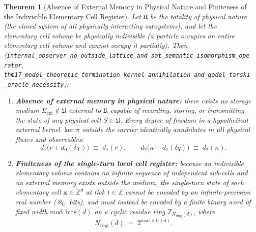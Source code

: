 \documentclass[11pt,a4paper]{article}
\theoremstyle{plain}
\newtheorem{theorem}{Theorem}[section]
\theoremstyle{definition}
\begin{document}
\begin{theorem}[Absence of External Memory in Physical Nature and Finiteness of the Indivisible Elementary Cell Register]
\label{thm:no-external-memory}
Let $\mathfrak{U}$ be the totality of physical nature (the closed system of all physically interacting subsystems), and let the elementary cell volume be physically indivisible (a particle occupies an entire elementary cell volume and cannot occupy it partially). Then (\texttt{internal\_\allowbreak observer\_\allowbreak no\_\allowbreak outside\_\allowbreak lattice\_\allowbreak and\_\allowbreak sat\_\allowbreak semantic\_\allowbreak isomorphism\_\allowbreak operator}, \texttt{thm17\_\allowbreak model\_\allowbreak theoretic\_\allowbreak termination\_\allowbreak kernel\_\allowbreak annihilation\_\allowbreak and\_\allowbreak godel\_\allowbreak tarski\_\allowbreak oracle\_\allowbreak necessity}):
\begin{enumerate}[label=\textbf{(\arabic*)},leftmargin=*]
\item \textbf{Absence of external memory in physical nature:}
  there exists no storage medium $E_{\mathrm{ext}} \notin \mathfrak{U}$ external to $\mathfrak{U}$ capable of recording, storing, or transmitting the state of any physical cell $S \in \mathfrak{U}$. Every degree of freedom in a hypothetical external kernel $\ker\pi$ outside the carrier identically annihilates in all physical fluxes and observables:
  \begin{equation}
    \label{eq:no-ext-memory-kernel}
    d_1\bigl(r + d_0(\delta\chi)\bigr) \;\equiv\; d_1(r),
    \qquad
    d_2\bigl(n + d_1(\delta q)\bigr) \;\equiv\; d_2(n).
  \end{equation}
\item \textbf{Finiteness of the single-turn local cell register:}
  because an indivisible elementary volume contains no infinite sequence of independent sub-cells and no external memory exists outside the medium, the single-turn state of each elementary cell $\mathbf{x} \in \mathbb{Z}^d$ at tick $t \in \mathbb{Z}$ cannot be encoded by an infinite-precision real number ($\aleph_0$ bits), and must instead be encoded by a finite binary word of fixed width $\mathrm{mod\_bits}(d)$ on a cyclic residue ring $\mathbb{Z}_{N_{\mathrm{ring}}(d)}$, where
  \begin{equation}
    \label{eq:nring-power-of-two}
    N_{\mathrm{ring}}(d) \;=\; 2^{\mathrm{mod\_bits}(d)}.
  \end{equation}
\end{enumerate}
\end{theorem}
\end{document}
